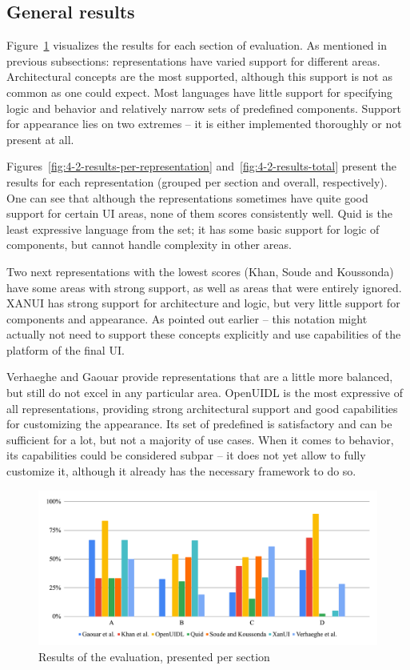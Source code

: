 \subsection{General results}\label{subsec:general-results}

Figure~\ref{fig:4-2-results-per-section} visualizes the results for each section of evaluation.
As mentioned in previous subsections: representations have varied support for different areas.
Architectural concepts are the most supported, although this support is not as common as one could expect.
Most languages have little support for specifying logic and behavior and relatively narrow sets of predefined components.
Support for appearance lies on two extremes -- it is either implemented thoroughly or not present at all.

Figures~\ref{fig:4-2-results-per-representation} and~\ref{fig:4-2-results-total} present the results for each representation (grouped per section and overall, respectively).
One can see that although the representations sometimes have quite good support for certain UI areas, none of them scores consistently well.
Quid is the least expressive language from the set;
it has some basic support for logic of components, but cannot handle complexity in other areas.

Two next representations with the lowest scores (Khan, Soude and Koussonda) have some areas with strong support, as well as areas that were entirely ignored.
XANUI has strong support for architecture and logic, but very little support for components and appearance.
As pointed out earlier -- this notation might actually not need to support these concepts explicitly and use capabilities of the platform of the final UI.

Verhaeghe and Gaouar provide representations that are a little more balanced, but still do not excel in any particular area.
OpenUIDL is the most expressive of all representations, providing strong architectural support and good capabilities for customizing the appearance.
Its set of predefined is satisfactory and can be sufficient for a lot, but not a majority of use cases.
When it comes to behavior, its capabilities could be considered subpar -- it does not yet allow to fully customize it, although it already has the necessary framework to do so.

\begin{figure}
    \centering
    \includegraphics[width=\textwidth]{4-results-and-discussion/results-per-section}
    \caption{Results of the evaluation, presented per section}
    \label{fig:4-2-results-per-section}
\end{figure}

